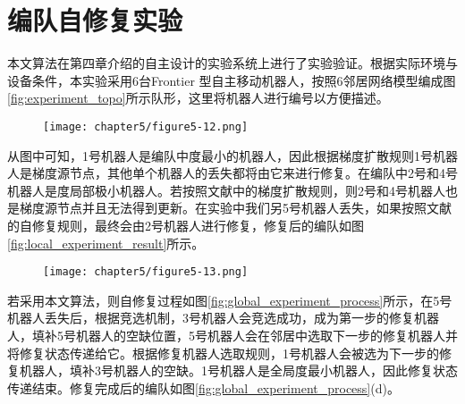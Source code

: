 \section{编队自修复实验}
本文算法在第四章介绍的自主设计的实验系统上进行了实验验证。根据实际环境与设备条件，本实验采用6台Frontier \uppercase\expandafter{}型自主移动机器人，按照6邻居网络模型编成图\ref{fig:experiment_topo}所示队形，这里将机器人进行编号以方便描述。
\begin{figure}
	\centering
	\texttt{[image: chapter5/figure5-12.png]}
\end{figure}
从图中可知，1号机器人是编队中度最小的机器人，因此根据梯度扩散规则1号机器人是梯度源节点，其他单个机器人的丢失都将由它来进行修复。在编队中2号和4号机器人是度局部极小机器人。若按照文献\parencite{liu2015gradient}中的梯度扩散规则，则2号和4号机器人也是梯度源节点并且无法得到更新。在实验中我们另5号机器人丢失，如果按照文献\parencite{liu2015gradient}的自修复规则，最终会由2号机器人进行修复，修复后的编队如图\ref{fig:local_experiment_result}所示。
\begin{figure}
	\centering
	\texttt{[image: chapter5/figure5-13.png]}
\end{figure}

若采用本文算法，则自修复过程如图\ref{fig:global_experiment_process}所示，在5号机器人丢失后，根据竞选机制，3号机器人会竞选成功，成为第一步的修复机器人，填补5号机器人的空缺位置，5号机器人会在邻居中选取下一步的修复机器人并将修复状态传递给它。根据修复机器人选取规则，1号机器人会被选为下一步的修复机器人，填补3号机器人的空缺。1号机器人是全局度最小机器人，因此修复状态传递结束。修复完成后的编队如图\ref{fig:global_experiment_process}(d)。
\begin{figure*}
	\centering
\end{figure*}

